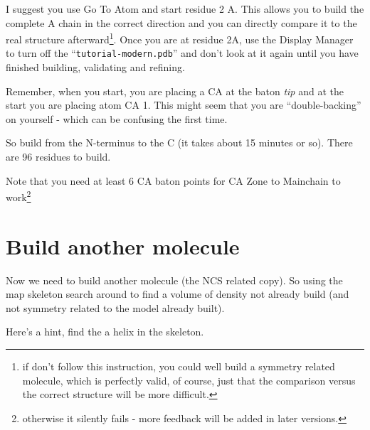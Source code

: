 \documentclass{article}
\begin{document}
I suggest you use Go To Atom and start residue 2 A. This allows you to
build the complete A chain in the correct direction and you can
directly compare it to the real structure afterward\footnote{if don't
  follow this instruction, you could well build a symmetry related
  molecule, which is perfectly valid, of course, just that the
  comparison versus the correct structure will be more difficult.}.
Once you are at residue 2A, use the Display Manager to turn off the
``{\small\texttt{tutorial-modern.pdb}}'' and don't look at it again
until you have finished building, validating and refining.
  
Remember, when you start, you are placing a CA at the baton
\emph{tip} and at the start you are placing atom CA 1.  This might
seem that you are ``double-backing'' on yourself - which can be
confusing the first time.

So build from the N-terminus to the C (it takes about 15 minutes or
so).  There are 96 residues to build.

Note that you need at least 6 CA baton points for CA Zone to Mainchain
to work\footnote{otherwise it silently fails - more feedback will be
  added in later versions.}

\section{Build another molecule}


Now we need to build another molecule (the NCS related copy).  So
using the map skeleton search around to find a volume of density not
already build (and not symmetry related to the model already built).

Here's a hint, find the a helix in the skeleton. 
\end{document}
